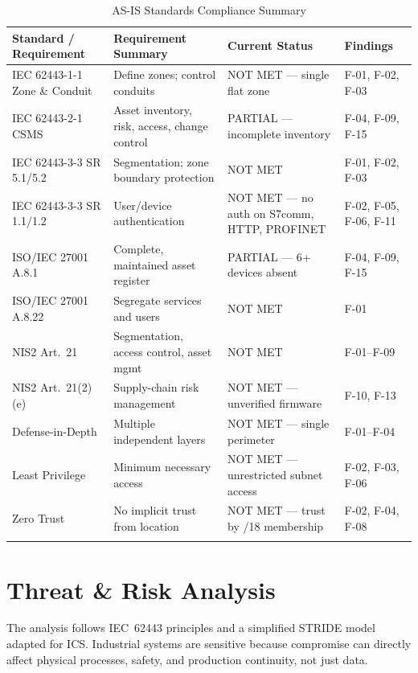 \documentclass{report}
\begin{document}
\begin{longtable}{L{3.6cm} L{4.6cm} L{3.8cm} L{2.6cm}}
\toprule
\textbf{Standard / Requirement} & \textbf{Requirement Summary} & \textbf{Current Status} & \textbf{Findings} \\
\midrule \endhead
IEC 62443-1-1 Zone \& Conduit & Define zones; control conduits & NOT MET --- single flat zone & F-01, F-02, F-03 \\
IEC 62443-2-1 CSMS & Asset inventory, risk, access, change control & PARTIAL --- incomplete inventory & F-04, F-09, F-15 \\
IEC 62443-3-3 SR 5.1/5.2 & Segmentation; zone boundary protection & NOT MET & F-01, F-02, F-03 \\
IEC 62443-3-3 SR 1.1/1.2 & User/device authentication & NOT MET --- no auth on S7comm, HTTP, PROFINET & F-02, F-05, F-06, F-11 \\
ISO/IEC 27001 A.8.1 & Complete, maintained asset register & PARTIAL --- 6+ devices absent & F-04, F-09, F-15 \\
ISO/IEC 27001 A.8.22 & Segregate services and users & NOT MET & F-01 \\
NIS2 Art.~21 & Segmentation, access control, asset mgmt & NOT MET & F-01--F-09 \\
NIS2 Art.~21(2)(e) & Supply-chain risk management & NOT MET --- unverified firmware & F-10, F-13 \\
Defense-in-Depth & Multiple independent layers & NOT MET --- single perimeter & F-01--F-04 \\
Least Privilege & Minimum necessary access & NOT MET --- unrestricted subnet access & F-02, F-03, F-06 \\
Zero Trust & No implicit trust from location & NOT MET --- trust by /18 membership & F-02, F-04, F-08 \\
\bottomrule
\caption{AS-IS Standards Compliance Summary}
\end{longtable}


\chapter{Threat \& Risk Analysis}\label{chap:4-threatanalysis}
The analysis follows IEC~62443 principles and a simplified STRIDE model adapted for ICS. Industrial systems are sensitive because compromise can directly affect physical processes, safety, and production continuity, not just data.
\end{document}
